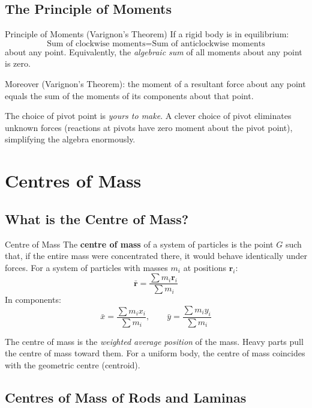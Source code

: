 \documentclass[12pt, a4paper]{book}
\newcommand{\rvec}{\mathbf{r}}
\begin{document}
\subsection{The Principle of Moments}

\begin{thm}{Principle of Moments (Varignon's Theorem)}{}
If a rigid body is in equilibrium:
\[
  \text{Sum of clockwise moments} = \text{Sum of anticlockwise moments}
\]
about any point. Equivalently, the \emph{algebraic sum} of all moments about any point is zero.

Moreover (Varignon's Theorem): the moment of a resultant force about any point equals the sum of the moments of its components about that point.
\end{thm}

\begin{intuitionbox}
The choice of pivot point is \emph{yours to make}. A clever choice of pivot eliminates unknown forces (reactions at pivots have zero moment about the pivot point), simplifying the algebra enormously.
\end{intuitionbox}

\section{Centres of Mass}

\subsection{What is the Centre of Mass?}

\begin{defn}{Centre of Mass}{}
The \textbf{centre of mass} of a system of particles is the point $G$ such that, if the entire mass were concentrated there, it would behave identically under forces. For a system of particles with masses $m_i$ at positions $\rvec_i$:
\[
  \bar{\rvec} = \frac{\sum m_i \rvec_i}{\sum m_i}
\]
In components:
\[
  \bar{x} = \frac{\sum m_i x_i}{\sum m_i}, \qquad \bar{y} = \frac{\sum m_i y_i}{\sum m_i}
\]
\end{defn}

\begin{intuitionbox}
The centre of mass is the \emph{weighted average position} of the mass. Heavy parts pull the centre of mass toward them. For a uniform body, the centre of mass coincides with the geometric centre (centroid).
\end{intuitionbox}

\subsection{Centres of Mass of Rods and Laminas}
\end{document}
